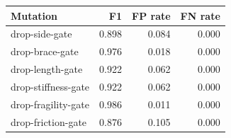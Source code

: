 \begin{tabular}{lrrr}
\toprule
Mutation & F1 & FP rate & FN rate \\
\midrule
drop-side-gate & 0.898 & 0.084 & 0.000 \\
drop-brace-gate & 0.976 & 0.018 & 0.000 \\
drop-length-gate & 0.922 & 0.062 & 0.000 \\
drop-stiffness-gate & 0.922 & 0.062 & 0.000 \\
drop-fragility-gate & 0.986 & 0.011 & 0.000 \\
drop-friction-gate & 0.876 & 0.105 & 0.000 \\
\bottomrule
\end{tabular}
